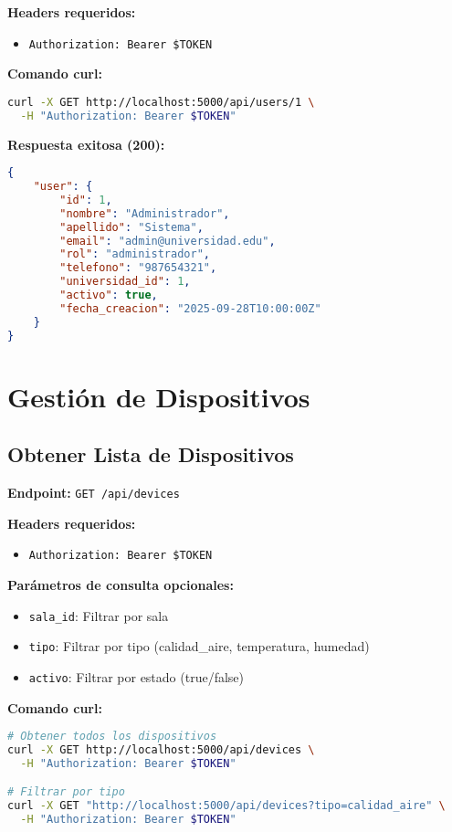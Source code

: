\documentclass[12pt,a4paper]{article}
\begin{document}
\textbf{Headers requeridos:}
\begin{itemize}
\item \texttt{Authorization: Bearer \$TOKEN}
\end{itemize}

\textbf{Comando curl:}
\begin{lstlisting}[language=bash]
curl -X GET http://localhost:5000/api/users/1 \
  -H "Authorization: Bearer $TOKEN"
\end{lstlisting}

\textbf{Respuesta exitosa (200):}
\begin{lstlisting}[language=JSON]
{
    "user": {
        "id": 1,
        "nombre": "Administrador",
        "apellido": "Sistema",
        "email": "admin@universidad.edu",
        "rol": "administrador",
        "telefono": "987654321",
        "universidad_id": 1,
        "activo": true,
        "fecha_creacion": "2025-09-28T10:00:00Z"
    }
}
\end{lstlisting}

\section{Gestión de Dispositivos}

\subsection{Obtener Lista de Dispositivos}

\textbf{Endpoint:} \texttt{GET /api/devices}

\textbf{Headers requeridos:}
\begin{itemize}
\item \texttt{Authorization: Bearer \$TOKEN}
\end{itemize}

\textbf{Parámetros de consulta opcionales:}
\begin{itemize}
\item \texttt{sala\_id}: Filtrar por sala
\item \texttt{tipo}: Filtrar por tipo (calidad\_aire, temperatura, humedad)
\item \texttt{activo}: Filtrar por estado (true/false)
\end{itemize}

\textbf{Comando curl:}
\begin{lstlisting}[language=bash]
# Obtener todos los dispositivos
curl -X GET http://localhost:5000/api/devices \
  -H "Authorization: Bearer $TOKEN"

# Filtrar por tipo
curl -X GET "http://localhost:5000/api/devices?tipo=calidad_aire" \
  -H "Authorization: Bearer $TOKEN"
\end{lstlisting}
\end{document}
